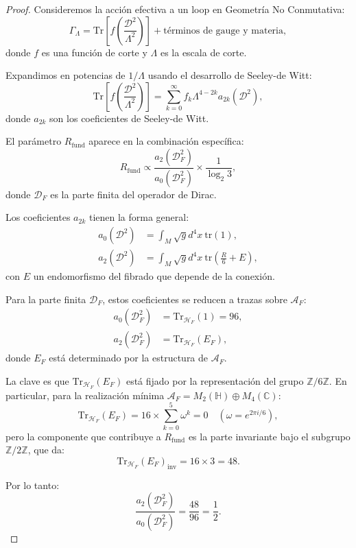 \documentclass[12pt, a4paper]{article}
\theoremstyle{plain}
\theoremstyle{definition}
\begin{document}
\begin{proof}
Consideremos la acción efectiva a un loop en Geometría No Conmutativa:
\[
\Gamma_\Lambda = \mathrm{Tr}\left[f\left(\frac{\mathcal{D}^2}{\Lambda^2}\right)\right] + \text{términos de gauge y materia},
\]
donde $f$ es una función de corte y $\Lambda$ es la escala de corte.

Expandimos en potencias de $1/\Lambda$ usando el desarrollo de Seeley-de Witt:
\[
\mathrm{Tr}\left[f\left(\frac{\mathcal{D}^2}{\Lambda^2}\right)\right] = \sum_{k=0}^\infty f_k \Lambda^{4-2k} a_{2k}(\mathcal{D}^2),
\]
donde $a_{2k}$ son los coeficientes de Seeley-de Witt.

El parámetro $R_{\text{fund}}$ aparece en la combinación específica:
\[
R_{\text{fund}} \propto \frac{a_2(\mathcal{D}_F^2)}{a_0(\mathcal{D}_F^2)} \times \frac{1}{\log_2 3},
\]
donde $\mathcal{D}_F$ es la parte finita del operador de Dirac.

Los coeficientes $a_{2k}$ tienen la forma general:
\begin{align*}
a_0(\mathcal{D}^2) &= \int_M \sqrt{g} d^4x \ \mathrm{tr}(1), \\
a_2(\mathcal{D}^2) &= \int_M \sqrt{g} d^4x \ \mathrm{tr}\left(\frac{R}{6} + E\right),
\end{align*}
con $E$ un endomorfismo del fibrado que depende de la conexión.

Para la parte finita $\mathcal{D}_F$, estos coeficientes se reducen a trazas sobre $\mathcal{A}_F$:
\begin{align*}
a_0(\mathcal{D}_F^2) &= \mathrm{Tr}_{\mathcal{H}_F}(1) = 96, \\
a_2(\mathcal{D}_F^2) &= \mathrm{Tr}_{\mathcal{H}_F}(E_F),
\end{align*}
donde $E_F$ está determinado por la estructura de $\mathcal{A}_F$.

La clave es que $\mathrm{Tr}_{\mathcal{H}_F}(E_F)$ está fijado por la representación del grupo $\mathbb{Z}/6\mathbb{Z}$. En particular, para la realización mínima $\mathcal{A}_F = M_2(\mathbb{H}) \oplus M_4(\mathbb{C})$:
\[
\mathrm{Tr}_{\mathcal{H}_F}(E_F) = 16 \times \sum_{k=0}^5 \omega^k = 0 \quad (\omega = e^{2\pi i/6}),
\]
pero la componente que contribuye a $R_{\text{fund}}$ es la parte invariante bajo el subgrupo $\mathbb{Z}/2\mathbb{Z}$, que da:
\[
\mathrm{Tr}_{\mathcal{H}_F}(E_F)_{\text{inv}} = 16 \times 3 = 48.
\]

Por lo tanto:
\[
\frac{a_2(\mathcal{D}_F^2)}{a_0(\mathcal{D}_F^2)} = \frac{48}{96} = \frac{1}{2}.
\]


\end{proof}
\end{document}

